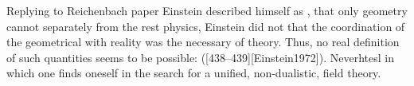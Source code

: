 {%












Replying to Reichenbach paper Einstein described himself as , that only  geometry cannot separately from the rest physics, Einstein did not that the coordination of the geometrical with reality was the necessary of theory. Thus, no real definition of such quantities seems to be possible:  ([438--439][Einstein1972]).  Neverhtesl  in which one finds oneself in the search for a unified, non-dualistic, field theory. 



}
